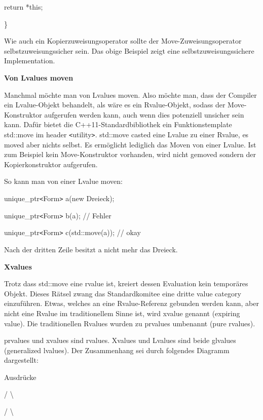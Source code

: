 \documentclass{article}
\begin{document}
\vspace{12pt}
return *this;

\}

\parindent=0pt
Wie auch ein Kopierzuweisungsoperator sollte der Move-Zuweisungsoperator selbstzuweisungssicher 
sein. Das obige Beispiel zeigt eine selbstzuweisungssichere Implementation.

\vspace{12pt}
\textbf{Von Lvalues moven}

Manchmal möchte man von Lvalues moven. Also möchte man, dass der Compiler ein 
Lvalue-Objekt behandelt, als wäre es ein Rvalue-Objekt, sodass der Move-Konstruktor 
aufgerufen werden kann, auch wenn dies potenziell unsicher sein kann. Dafür bietet 
die C++11-Standardbibliothek ein Funktionstemplate std::move im header \texttt{<}utility\texttt{>}. 
std::move casted eine Lvalue zu einer Rvalue, es moved aber nichts selbst. Es ermöglicht 
lediglich das Moven von einer Lvalue. Ist zum Beispiel kein Move-Konstruktor vorhanden, 
wird nicht gemoved sondern der Kopierkonstruktor aufgerufen.

So kann man von einer Lvalue moven:

unique\_ptr\texttt{<}Form\texttt{>} a(new Dreieck);

unique\_ptr\texttt{<}Form\texttt{>} b(a);            // Fehler

unique\_ptr\texttt{<}Form\texttt{>} c(std::move(a)); // okay

\vspace{12pt}
Nach der dritten Zeile besitzt a nicht mehr das Dreieck.

\vspace{12pt}
\textbf{Xvalues}

Trotz dass std::move eine rvalue ist, kreiert dessen Evaluation kein temporäres 
Objekt. Dieses Rätsel zwang das Standardkomitee eine dritte value category einzuführen. 
Etwas, welches an eine Rvalue-Referenz gebunden werden kann, aber nicht eine Rvalue 
im traditionellem Sinne ist, wird xvalue genannt (expiring value). Die traditionellen 
Rvalues wurden zu prvalues umbenannt (pure rvalues).

prvalues und xvalues sind rvalues. Xvalues und Lvalues sind beide glvalues (generalized 
lvalues). Der Zusammenhang sei durch folgendes Diagramm dargestellt:          

\parindent=7pt
Ausdrücke          

\parindent=36pt
/     \textbackslash{}         

\parindent=32pt
/       \textbackslash{}        
\end{document}
